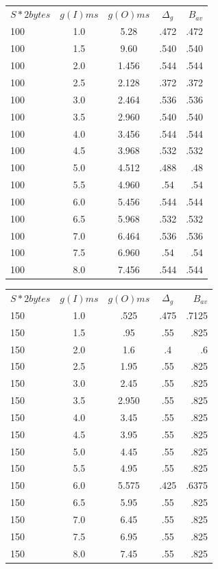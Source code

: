 \documentclass{jhwhw}
\begin{document}
\begin{tabular}{l | c | c | c | r}
$S * 2 bytes$ & $g(I) ms$ & $g(O) ms$ & $\Delta_{g}$ & $B_{av}$\\
100 & 1.0 & 5.28 & .472 & .472\\
100 & 1.5 & 9.60 & .540 & .540 \\
100 & 2.0 & 1.456 & .544 & .544 \\
100 & 2.5 & 2.128 & .372 & .372 \\
100 & 3.0 & 2.464 & .536 & .536 \\
100 & 3.5 & 2.960 & .540 & .540 \\
100 & 4.0 & 3.456 & .544 & .544 \\
100 & 4.5 & 3.968 & .532 & .532 \\
100 & 5.0 & 4.512 & .488 & .48 \\
100 & 5.5 & 4.960 & .54 & .54 \\
100 & 6.0 & 5.456 & .544 & .544 \\
100 & 6.5 & 5.968 & .532 & .532 \\
100 & 7.0 & 6.464 & .536 & .536 \\
100 & 7.5 & 6.960 & .54 & .54 \\
100 & 8.0 & 7.456 & .544 & .544 \\
\end{tabular}

\begin{tabular}{l | c | c | c | r}
$S * 2 bytes$ & $g(I) ms$ & $g(O) ms$ & $\Delta_{g}$ & $B_{av}$\\
150 & 1.0 & .525 & .475 & .7125 \\
150 & 1.5 & .95 & .55 & .825 \\
150 & 2.0 & 1.6 & .4 & .6 \\
150 & 2.5 & 1.95 & .55 & .825 \\
150 & 3.0 & 2.45 & .55 & .825 \\
150 & 3.5 & 2.950 & .55 & .825 \\
150 & 4.0 & 3.45 & .55 & .825 \\
150 & 4.5 & 3.95 & .55 & .825 \\
150 & 5.0 & 4.45 & .55 & .825 \\
150 & 5.5 & 4.95 & .55 & .825 \\
150 & 6.0 & 5.575 & .425 & .6375 \\
150 & 6.5 & 5.95 & .55 & .825 \\
150 & 7.0 & 6.45 & .55 & .825 \\
150 & 7.5 & 6.95 & .55 & .825 \\
150 & 8.0 & 7.45 & .55 & .825 \\
\end{tabular}
\end{document}
